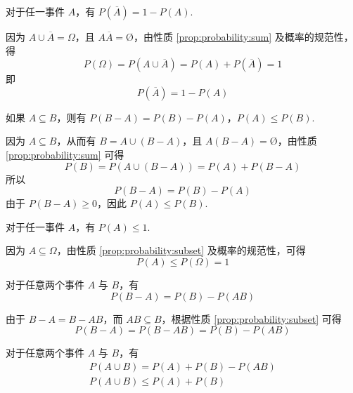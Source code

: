 \begin{property} \label{prop:probability:converse}
    对于任一事件 $A$，有 $P(\overline{A})=1-P(A)$.
\end{property}

\begin{myproof}
    因为 $A \cup \overline{A} = \varOmega$，且 $A \overline{A} = \text{\O}$，由性质 \ref*{prop:probability:sum} 及概率的规范性，得
    $$
    P(\varOmega) = P(A \cup \overline{A}) = P(A) + P(\overline{A}) = 1
    $$
    即
    \[
    P(\overline{A})=1-P(A)
    \]
\end{myproof}

\begin{property} \label{prop:probability:subset}
    如果 $A \subseteq B$，则有 $P(B-A)=P(B)-P(A)$，$P(A) \leqslant P(B)$.
\end{property}

\begin{myproof}
    因为 $A \subseteq B$，从而有 $B = A \cup (B-A)$，且 $A(B-A)=\text{\O}$，由性质 \ref*{prop:probability:sum} 可得
    $$
    P(B) = P(A \cup (B-A)) = P(A) + P(B-A)
    $$
    所以
    $$
    P(B-A)=P(B)-P(A)
    $$
    由于 $P(B-A) \geqslant 0$，因此 $P(A) \leqslant P(B)$.
\end{myproof}

\begin{property} \label{prop:probability:<=1}
    对于任一事件 $A$，有 $P(A) \leqslant 1$.
\end{property}

\begin{myproof}
    因为 $A \subseteq \varOmega$，由性质 \ref*{prop:probability:subset} 及概率的规范性，可得
    \[
    P(A) \leqslant P(\varOmega) = 1
    \]
\end{myproof}

\begin{property}[（概率的减法公式）] \label{prop:probability:subtraction}
    对于任意两个事件 $A$ 与 $B$，有
    \begin{equation}
        P(B-A)=P(B)-P(AB)
    \end{equation}
\end{property}

\begin{myproof}
    由于 $B-A=B-AB$，而 $AB \subseteq B$，根据性质 \ref*{prop:probability:subset} 可得
    \[
    P(B-A)=P(B-AB)=P(B)-P(AB)
    \]
\end{myproof}

\begin{property} \label{prop:probability:add}
    对于任意两个事件 $A$ 与 $B$，有
    \begin{gather} \label{equation:add}
        P(A \cup B) = P(A) + P(B) - P(AB) \\
        P(A \cup B) \leqslant P(A) + P(B) \nonumber
    \end{gather}
\end{property}


